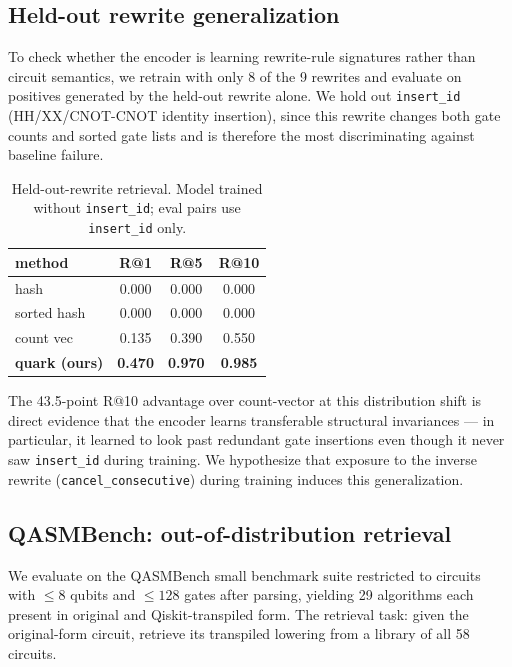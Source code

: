 \documentclass[11pt]{article}
\begin{document}
\subsection{Held-out rewrite generalization}

To check whether the encoder is learning rewrite-rule signatures rather than circuit semantics, we retrain with only 8 of the 9 rewrites and evaluate on positives generated by the held-out rewrite alone. We hold out \texttt{insert\_id} (HH/XX/CNOT-CNOT identity insertion), since this rewrite changes both gate counts and sorted gate lists and is therefore the most discriminating against baseline failure.

\begin{table}[h]
\centering
\begin{tabular}{lccc}
\toprule
method & R@1 & R@5 & R@10 \\
\midrule
hash & 0.000 & 0.000 & 0.000 \\
sorted hash & 0.000 & 0.000 & 0.000 \\
count vec & 0.135 & 0.390 & 0.550 \\
\textbf{quark (ours)} & \textbf{0.470} & \textbf{0.970} & \textbf{0.985} \\
\bottomrule
\end{tabular}
\caption{Held-out-rewrite retrieval. Model trained without \texttt{insert\_id}; eval pairs use \texttt{insert\_id} only.}
\end{table}

The 43.5-point R@10 advantage over count-vector at this distribution shift is direct evidence that the encoder learns transferable structural invariances --- in particular, it learned to look past redundant gate insertions even though it never saw \texttt{insert\_id} during training. We hypothesize that exposure to the inverse rewrite (\texttt{cancel\_consecutive}) during training induces this generalization.

\subsection{QASMBench: out-of-distribution retrieval}

We evaluate on the QASMBench small benchmark suite \cite{qasmbench} restricted to circuits with $\leq 8$ qubits and $\leq 128$ gates after parsing, yielding 29 algorithms each present in original and Qiskit-transpiled form. The retrieval task: given the original-form circuit, retrieve its transpiled lowering from a library of all 58 circuits.
\end{document}
